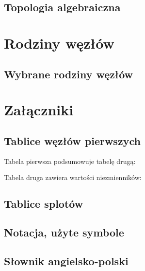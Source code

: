 \documentclass{LegrandOrangeBook}
\begin{document}
\chapter{Topologia algebraiczna}






\part{Rodziny węzłów}
\chapter{Wybrane rodziny węzłów}










\part{Załączniki}
\chapterspaceabove{5.75cm} %
\chapterspacebelow{7.25cm} %

\begin{appendices}
    \renewcommand{\chaptername}{Appendix} %
    \chapter{Tablice węzłów pierwszych}
    
    Tabela pierwsza podsumowuje tabelę drugą:
    
    \newpage
    Tabela druga zawiera wartości niezmienników:
    
    

    \chapter{Tablice splotów}
    

    \chapter{Notacja, użyte symbole}
    

    \chapter{Słownik angielsko-polski}
    \begin{compactitem}
    
    \end{compactitem}
\end{appendices}


\end{document}
